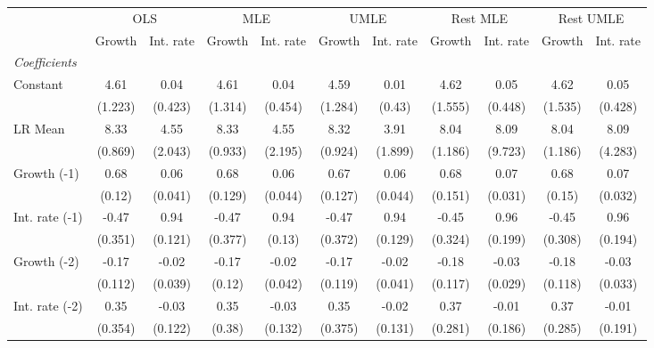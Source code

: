 \begin{table}[htbp] 
	\centering
	\begin{tabular}{@{\extracolsep{4pt}}lcccccccccc@{}}		\hline\hline
		 		 & \multicolumn{2}{c}{OLS} &\multicolumn{2}{c}{MLE} &\multicolumn{2}{c}{UMLE} &\multicolumn{2}{c}{Rest MLE} &\multicolumn{2}{c}{Rest UMLE} \\ 
 		 & Growth 	 & Int. rate 	 & Growth 	 & Int. rate 	 & Growth 	 & Int. rate 	 & Growth 	 & Int. rate 	 & Growth 	 & Int. rate\\\cline{2-3}\cline{4-5}\cline{6-7}\cline{8-9}\cline{10-11}
\rule{0pt}{4ex} 
 \emph{Coefficients} 	  		 & 		 & 		 & 		 & 		 & 		 & 		 & 		 & 		 & 		 &\\ 
\quad Constant 	 & 4.61 	 & 0.04 	 & 4.61 	 & 0.04 	 & 4.59 	 & 0.01 	 & 4.62 	 & 0.05 	 & 4.62 	 & 0.05	 \\ 
 		 & (1.223) 	 & (0.423) 	 & (1.314) 	 & (0.454) 	 & (1.284) 	 & (0.43) 	 & (1.555) 	 & (0.448) 	 & (1.535) 	 & (0.428) 	 \\ 
\quad LR Mean 	 & 8.33 	 & 4.55 	 & 8.33 	 & 4.55 	 & 8.32 	 & 3.91 	 & 8.04 	 & 8.09 	 & 8.04 	 & 8.09	 \\ 
 		 & (0.869) 	 & (2.043) 	 & (0.933) 	 & (2.195) 	 & (0.924) 	 & (1.899) 	 & (1.186) 	 & (9.723) 	 & (1.186) 	 & (4.283) 	 \\ 
\quad Growth (-1) 	 &0.68 	 & 0.06 	 & 0.68 	 & 0.06 	 & 0.67 	 & 0.06 	 & 0.68 	 & 0.07 	 & 0.68 	 & 0.07	 \\ 
 		 & (0.12) 	 & (0.041) 	 & (0.129) 	 & (0.044) 	 & (0.127) 	 & (0.044) 	 & (0.151) 	 & (0.031) 	 & (0.15) 	 & (0.032) 	 \\ 
\quad Int. rate (-1) 	 &-0.47 	 & 0.94 	 & -0.47 	 & 0.94 	 & -0.47 	 & 0.94 	 & -0.45 	 & 0.96 	 & -0.45 	 & 0.96	 \\ 
 		 & (0.351) 	 & (0.121) 	 & (0.377) 	 & (0.13) 	 & (0.372) 	 & (0.129) 	 & (0.324) 	 & (0.199) 	 & (0.308) 	 & (0.194) 	 \\ 
\quad Growth (-2) 	 &-0.17 	 & -0.02 	 & -0.17 	 & -0.02 	 & -0.17 	 & -0.02 	 & -0.18 	 & -0.03 	 & -0.18 	 & -0.03	 \\ 
 		 & (0.112) 	 & (0.039) 	 & (0.12) 	 & (0.042) 	 & (0.119) 	 & (0.041) 	 & (0.117) 	 & (0.029) 	 & (0.118) 	 & (0.033) 	 \\ 
\quad Int. rate (-2) 	 &0.35 	 & -0.03 	 & 0.35 	 & -0.03 	 & 0.35 	 & -0.02 	 & 0.37 	 & -0.01 	 & 0.37 	 & -0.01	 \\ 
 		 & (0.354) 	 & (0.122) 	 & (0.38) 	 & (0.132) 	 & (0.375) 	 & (0.131) 	 & (0.281) 	 & (0.186) 	 & (0.285) 	 & (0.191) 	 \\ 

\end{tabular}
\end{table}
